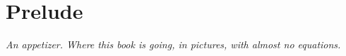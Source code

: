 \part*{Prelude}

\begin{fullwidth}
\noindent\textit{An appetizer. Where this book is going, in pictures, with almost no equations.}
\end{fullwidth}
